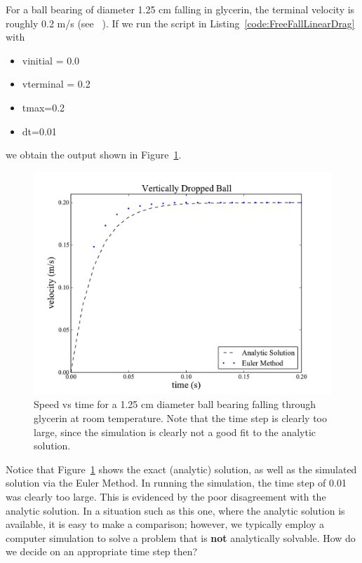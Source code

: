For a ball bearing of diameter 1.25 cm falling in glycerin, the terminal velocity is roughly 0.2 m/s (see ~\cite{Baamann:2002}). If we run the script in Listing~\ref{code:FreeFallLinearDrag} with 
\begin{itemize}
	\item vinitial = 0.0
	\item vterminal = 0.2
	\item  tmax=0.2
	\item dt=0.01
\end{itemize}
we obtain the output shown in Figure~\ref{fig:glycerin}.
\begin{figure}
\centering
\includegraphics[width=\textwidth]{Figures/Kinematics/FreeFallVertical}
\caption{Speed vs time for a 1.25 cm diameter ball bearing falling through glycerin at room temperature. Note that the time step is clearly too large,
since the simulation is clearly not a good fit to the analytic solution.}
\label{fig:glycerin}       %
\end{figure}

Notice that Figure~\ref{fig:glycerin} shows the exact (analytic) solution, as well as the simulated solution via the Euler Method. In running the simulation, the time step of 0.01 was clearly too large. This is evidenced by the poor disagreement with the analytic solution. In a situation such as this one, where the analytic solution is available, it is easy to make a comparison; however, we typically employ a computer simulation to solve a problem that is \textbf{not} analytically solvable. How do we decide on an appropriate time step then?

